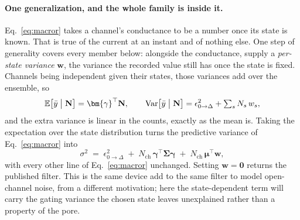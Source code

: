 \begin{appendixbox}
\paragraph{One generalization, and the whole family is inside it.}
Eq.~\ref{eq:macror} takes a channel's conductance to be a number once its state is known. That is
true of the current at an instant and of nothing else. One step of generality covers every member
below: alongside the conductance, supply a \emph{per-state variance} $\mathbf{w}$, the variance the
recorded value still has once the state is fixed. Channels being independent given their states,
those variances add over the ensemble, so
\begin{equation}
  \mathbb{E}\bigl[\bar y \bigm| \mathbf{N}\bigr]=\bm{\gamma}^\top\mathbf{N},
  \qquad
  \mathrm{Var}\bigl[\bar y \bigm| \mathbf{N}\bigr]
    =\epsilon^2_{0\to\Delta}+\textstyle\sum_s N_s\,w_s ,
  \label{eq:emission}
\end{equation}
and the extra variance is linear in the counts, exactly as the mean is. Taking the expectation over
the state distribution turns the predictive variance of Eq.~\ref{eq:macror} into
\begin{equation}
  \sigma^2 \;=\; \epsilon^2_{0\to\Delta}
    \;+\; N_{\mathrm{ch}}\,\bm{\gamma}^\top\bm{\Sigma}\bm{\gamma}
    \;+\; N_{\mathrm{ch}}\,\bm{\mu}^\top\mathbf{w},
  \label{eq:macror-w}
\end{equation}
with every other line of Eq.~\ref{eq:macror} unchanged. Setting $\mathbf{w}=\bm{0}$ returns the
published filter. This is the same device \citet{munch2022bayesian} add to the same filter to model
open-channel noise, from a different motivation; here the state-dependent term will carry the
gating variance the chosen state leaves unexplained rather than a property of the pore.


\end{appendixbox}
